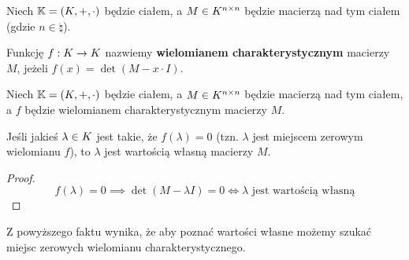 \begin{definition}
Niech \(\mathbb{K} = (K, +, \cdot)\) będzie ciałem, a \(M \in K^{n \times n}\) będzie macierzą nad tym ciałem (gdzie \(n \in \natural\)). 

Funkcję \(f: K \rightarrow K\) nazwiemy \textbf{wielomianem charakterystycznym} macierzy \(M\), jeżeli \(f(x) = \det{(M - x \cdot I)}\). 
\end{definition}

\begin{fact}
Niech \(\mathbb{K} = (K, +, \cdot)\) będzie ciałem, a \(M \in K^{n \times n}\) będzie macierzą nad tym ciałem, a \(f\) będzie wielomianem charakterystycznym macierzy \(M\).

Jeśli jakieś \(\lambda \in K\) jest takie, że \(f(\lambda)=0\) (tzn. \(\lambda\) jest miejscem zerowym wielomianu \(f\)), to \(\lambda\) jest wartością własną macierzy \(M\).
\end{fact}
\begin{proof}
\[
    f(\lambda) = 0 \implies \det{(M - \lambda I)} = 0 \iff \text{\(\lambda\) jest wartością własną} 
\]
\end{proof}

Z powyższego faktu wynika, że aby poznać wartości własne możemy szukać miejsc zerowych wielomianu charakterystycznego.